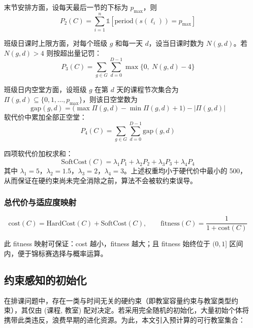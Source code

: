末节安排方面，设每天最后一节的下标为 $p_{\max}$，则
\begin{equation}
  P_2(C) = \sum_{i=1}^{n} \mathbb{1}[\mathrm{period}(s(\ell_i)) = p_{\max}]
\end{equation}

班级日课时上限方面，对每个班级 $g$ 和每一天 $d$，设当日课时数为 $N(g,d)$。若 $N(g,d) > 4$ 则按超出量记罚：
\begin{equation}
  P_3(C) = \sum_{g \in G} \sum_{d=0}^{D-1} \max\{0,\; N(g,d) - 4\}
\end{equation}

班级日内空堂方面，设班级 $g$ 在第 $d$ 天的课程节次集合为 $\Pi(g,d) \subseteq \{0,1,\ldots,p_{\max}\}$，则该日空堂数为
\begin{equation}
  \mathrm{gap}(g,d) = \big(\max \Pi(g,d) - \min \Pi(g,d) + 1\big) - |\Pi(g,d)|
\end{equation}
软代价中累加全部正空堂：
\begin{equation}
  P_4(C) = \sum_{g \in G} \sum_{d=0}^{D-1} \mathrm{gap}(g,d)
\end{equation}

四项软代价加权求和：
\begin{equation}
  \mathrm{SoftCost}(C) = \lambda_1 P_1 + \lambda_2 P_2 + \lambda_3 P_3 + \lambda_4 P_4
\end{equation}
其中 $\lambda_1 = 5$，$\lambda_2 = 1.5$，$\lambda_3 = 2$，$\lambda_4 = 3$。上述权重均小于硬代价中最小的 500，从而保证在硬约束尚未完全消除之前，算法不会被软约束误导。

\subsubsection{总代价与适应度映射}

\begin{equation}
  \mathrm{cost}(C) = \mathrm{HardCost}(C) + \mathrm{SoftCost}(C), \qquad
  \mathrm{fitness}(C) = \frac{1}{1 + \mathrm{cost}(C)}
\end{equation}

此 fitness 映射可保证：cost 越小，fitness 越大；且 fitness 始终位于 $(0, 1]$ 区间内，便于锦标赛选择与概率运算。

\subsection{约束感知的初始化}

在排课问题中，存在一类与时间无关的硬约束（即教室容量约束与教室类型约束），其仅由 (课程, 教室) 配对决定。若采用完全随机的初始化，大量初始个体将携带此类违反，浪费早期的进化资源。为此，本文引入预计算的可行教室集合：

